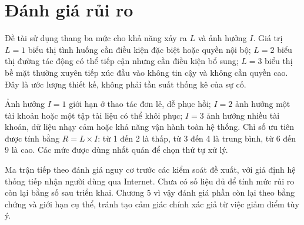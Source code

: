 \section{Đánh giá rủi ro}
Đề tài sử dụng thang ba mức cho khả năng xảy ra $L$ và ảnh hưởng $I$. Giá trị $L=1$ biểu thị tình huống cần điều kiện đặc biệt hoặc quyền nội bộ; $L=2$ biểu thị đường tác động có thể tiếp cận nhưng cần điều kiện bổ sung; $L=3$ biểu thị bề mặt thường xuyên tiếp xúc đầu vào không tin cậy và không cần quyền cao. Đây là ước lượng thiết kế, không phải tần suất thống kê của sự cố.

Ảnh hưởng $I=1$ giới hạn ở thao tác đơn lẻ, dễ phục hồi; $I=2$ ảnh hưởng một tài khoản hoặc một tập tài liệu có thể khôi phục; $I=3$ ảnh hưởng nhiều tài khoản, dữ liệu nhạy cảm hoặc khả năng vận hành toàn hệ thống. Chỉ số ưu tiên được tính bằng $R=L\times I$: từ 1 đến 2 là thấp, từ 3 đến 4 là trung bình, từ 6 đến 9 là cao. Các mức được dùng nhất quán để chọn thứ tự xử lý.

Ma trận tiếp theo đánh giá nguy cơ trước các kiểm soát đề xuất, với giả định hệ thống tiếp nhận người dùng qua Internet. Chưa có số liệu đủ để tính mức rủi ro còn lại bằng số sau triển khai. Chương 5 vì vậy đánh giá phần còn lại theo bằng chứng và giới hạn cụ thể, tránh tạo cảm giác chính xác giả từ việc giảm điểm tùy ý.

